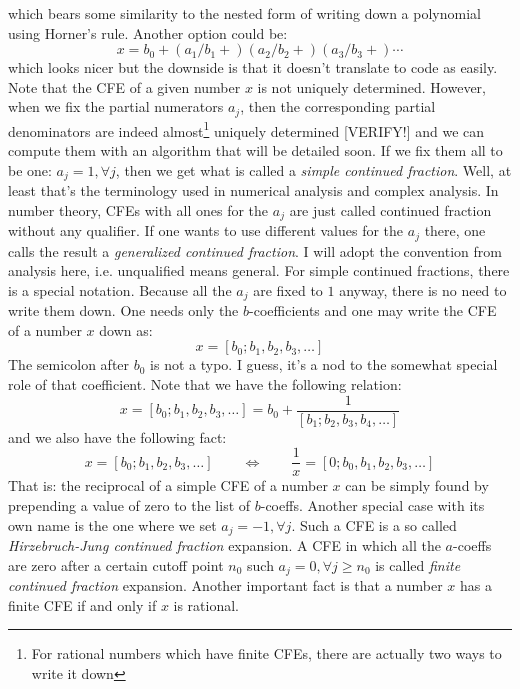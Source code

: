 which bears some similarity to the nested form of writing down a polynomial using Horner's rule. Another option could be:
\begin{equation}
x = b_0 + (a_1/b_1+) (a_2/b_2+) (a_3/b_3+) \cdots
\end{equation}
which looks nicer but the downside is that it doesn't translate to code as easily. Note that the CFE of a given number $x$ is not uniquely determined. However, when we fix the partial numerators $a_j$, then the corresponding partial denominators are indeed almost\footnote{For rational numbers which have finite CFEs, there are actually two ways to write it down} uniquely determined [VERIFY!] and we can compute them with an algorithm that will be detailed soon. If we fix them all to be one: $a_j = 1, \forall j$, then we get what is called a \emph{simple continued fraction}. Well, at least that's the terminology used in numerical analysis and complex analysis. In number theory, CFEs with all ones for the $a_j$ are just called continued fraction without any qualifier. If one wants to use different values for the $a_j$ there, one calls the result a \emph{generalized continued fraction}. I will adopt the convention from analysis here, i.e. unqualified means general. For simple continued fractions, there is a special notation. Because all the $a_j$ are fixed to $1$ anyway, there is no need to write them down. One needs only the $b$-coefficients and one may write the CFE of a number $x$ down as:
\begin{equation}
x = [b_0; b_1, b_2, b_3, \ldots]
\end{equation}
The semicolon after $b_0$ is not a typo. I guess, it's a nod to the somewhat special role of that coefficient. Note that we have the following relation:
\begin{equation}
x = [b_0; b_1, b_2, b_3, \ldots] = b_0 + \frac{1}{[b_1; b_2, b_3, b_4, \ldots]}
\end{equation}
and we also have the following fact:
\begin{equation}
x = [b_0; b_1, b_2, b_3, \ldots]  
\qquad \Leftrightarrow \qquad
\frac{1}{x} = [0; b_0, b_1, b_2, b_3, \ldots]  
\end{equation}
That is: the reciprocal of a simple CFE of a number $x$ can be simply found by prepending a value of zero to the list of $b$-coeffs. Another special case with its own name is the one where we set  $a_j = -1, \forall j$. Such a CFE is a so called \emph{Hirzebruch-Jung continued fraction} expansion. A CFE in which all the $a$-coeffs are zero after a certain cutoff point $n_0$ such $a_j = 0, \forall j \geq n_0$ is called \emph{finite continued fraction} expansion. Another important fact is that a number $x$ has a finite CFE if and only if $x$ is rational.

